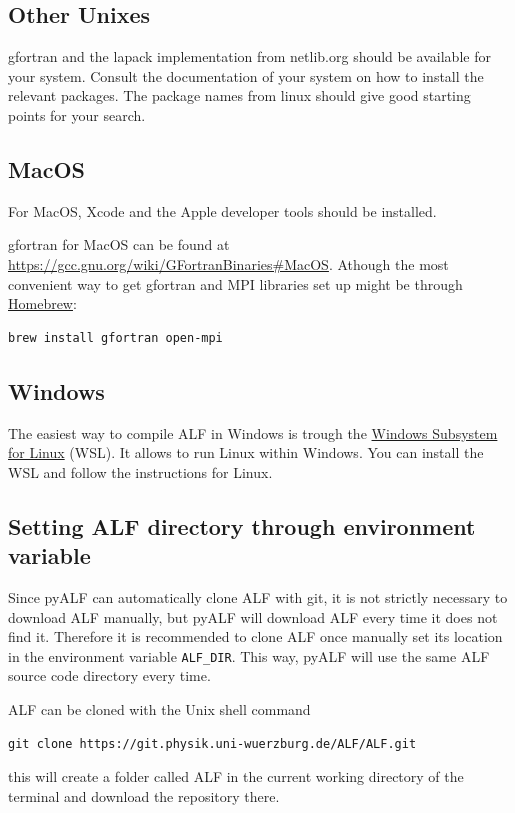 \documentclass[10pt,modern]{scrartcl}
\numberwithin{exerciseitem}{exercise} %
\begin{document}
\subsection*{Other Unixes}
gfortran and the lapack implementation from netlib.org should be available for your system. Consult the documentation of your system on how to install the relevant packages. The package names from linux should give good starting points for your search.

\subsection*{MacOS}
For MacOS, Xcode and the Apple developer tools should be installed.

gfortran for MacOS can be found at \url{https://gcc.gnu.org/wiki/GFortranBinaries#MacOS}.
Athough the most convenient way to get gfortran and MPI libraries set up might be through \href{https://brew.sh/}{Homebrew}:
\begin{lstlisting}[style=bash]
brew install gfortran open-mpi 
\end{lstlisting}

\subsection*{Windows}
The easiest way to compile ALF in Windows is trough the \href{https://docs.microsoft.com/en-us/windows/wsl/about}{Windows Subsystem for Linux} (WSL). It allows to run Linux within Windows. You can install the WSL and follow the instructions for Linux.

\subsection{Setting ALF directory through environment variable}
Since pyALF can automatically clone ALF with git, it is not strictly necessary to download ALF manually,
but pyALF will download ALF every time it does not find it.
Therefore it is recommended to clone ALF once manually set its location in the environment variable
\texttt{ALF\_DIR}. This way, pyALF will use the same ALF source code directory every time.

ALF can be cloned with the Unix shell command

\begin{lstlisting}[style=bash]
git clone https://git.physik.uni-wuerzburg.de/ALF/ALF.git
\end{lstlisting}

this will create a folder called ALF in the current working directory of the terminal and download the repository there.
\end{document}
